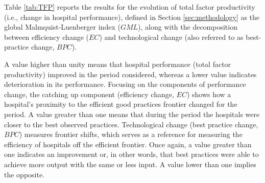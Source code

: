 \documentclass[11pt,a4paper,oneside]{article}
\begin{document}


Table \ref{tab:TFP} reports the results for the evolution of total factor productivity (i.e., change in hospital performance), defined in Section \ref{sec:methodology} as the global Malmquist-Luenberger index ($GML$), along with the decomposition between efficiency change ($EC$) and technological change (also referred to as best-practice change, $BPC$).




A value higher than unity means that hospital performance (total factor productivity) improved in the period considered, whereas a lower value indicates deterioration in its performance. Focusing on the components of performance change, the catching up component (efficiency change, $EC$) shows how a hospital's proximity to the efficient good practices frontier changed for the period. A value greater than one means that during the period the hospitals were closer to the best observed practices. Technological change (best practice change, $BPC$) measures frontier shifts, which serves as a reference for measuring the efficiency of hospitals off the efficient frontier. Once again, a value greater than one indicates an improvement or, in other words, that best practices were able to achieve more output with the same or less input. A value lower than one implies the opposite.
\end{document}
